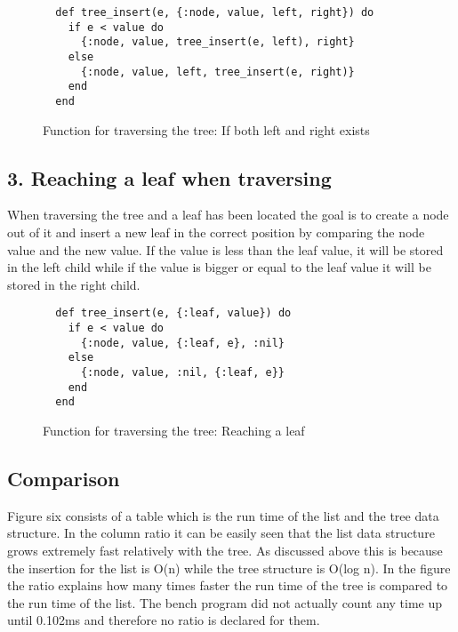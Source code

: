\documentclass[a4paper,11pt]{article}
\begin{document}
\begin{figure}[H]
\begin{verbatim}
  def tree_insert(e, {:node, value, left, right}) do
    if e < value do
      {:node, value, tree_insert(e, left), right}
    else
      {:node, value, left, tree_insert(e, right)}
    end
  end
\end{verbatim}
\caption{Function for traversing the tree: If both left and right exists}
\label{Figure:4}
\end{figure}

\subsection*{3. Reaching a leaf when traversing}
When traversing the tree and a leaf has been located the goal is to create a node out of it and insert a new leaf in the correct position by comparing the node value and the new value. If the value is less than the leaf value, it will be stored in the left child while if the value is bigger or equal to the leaf value it will be stored in the right child.

\begin{figure}[H]
\begin{verbatim}
  def tree_insert(e, {:leaf, value}) do
    if e < value do
      {:node, value, {:leaf, e}, :nil}
    else
      {:node, value, :nil, {:leaf, e}}
    end
  end
\end{verbatim}
\caption{Function for traversing the tree: Reaching a leaf}
\label{Figure:5}
\end{figure}

\subsection*{Comparison}
Figure six consists of a table which is the run time of the list and the tree data structure. In the column ratio it can be easily seen that the list data structure grows extremely fast relatively with the tree. As discussed above this is because the insertion for the list is O(n) while the tree structure is O(log n). In the figure the ratio explains how many times faster the run time of the tree is compared to the run time of the list. The bench program did not actually count any time up until 0.102ms and therefore no ratio is declared for them.
\end{document}
